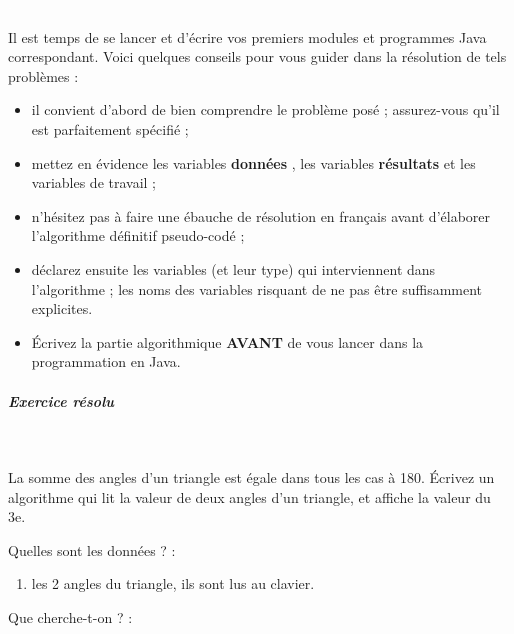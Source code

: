\documentclass[11pt,a4paper]{article}
\begin{document}
					\textcolor{white}{.} \par
				
          Il est temps de se lancer et d'\'ecrire vos premiers modules et programmes Java correspondant. 
          Voici quelques conseils pour vous guider dans la r\'esolution de tels probl\`emes :
          
					\begin{itemize}
				
			\item il convient d'abord de bien comprendre le probl\`eme pos\'e ; assurez-vous qu'il est parfaitement sp\'ecifi\'e ;
			\item mettez en \'evidence les variables \textbf{\guillemotleft  donn\'ees \guillemotright }, les variables \textbf{\guillemotleft  r\'esultats \guillemotright } et les variables de travail ;
			\item n'h\'esitez pas \`a faire une \'ebauche de r\'esolution en fran\c cais avant d'\'elaborer l'algorithme d\'efinitif pseudo-cod\'e ;
			\item d\'eclarez ensuite les variables (et leur type) qui interviennent dans l'algorithme ; les noms des variables risquant de ne pas \^etre suffisamment explicites.
			\item \'Ecrivez la partie algorithmique \textbf{AVANT} de vous lancer dans la programmation en Java.
					\end{itemize}
				
            \par
        
			
		\subparagraph{Exercice r\'esolu} 
		
					\textcolor{white}{.} \par
				
          La somme des angles d'un triangle est \'egale dans tous les cas \`a 180\textdegree . \'Ecrivez un algorithme qui lit la valeur de deux angles d'un triangle, et affiche la valeur du 3e. 
        
            \par
        
          Quelles sont les donn\'ees ? :
          
					\begin{enumerate}
				
			\item les 2 angles du triangle, ils sont lus au clavier.
					\end{enumerate}
				
          Que cherche-t-on ? :
          
\end{document}
